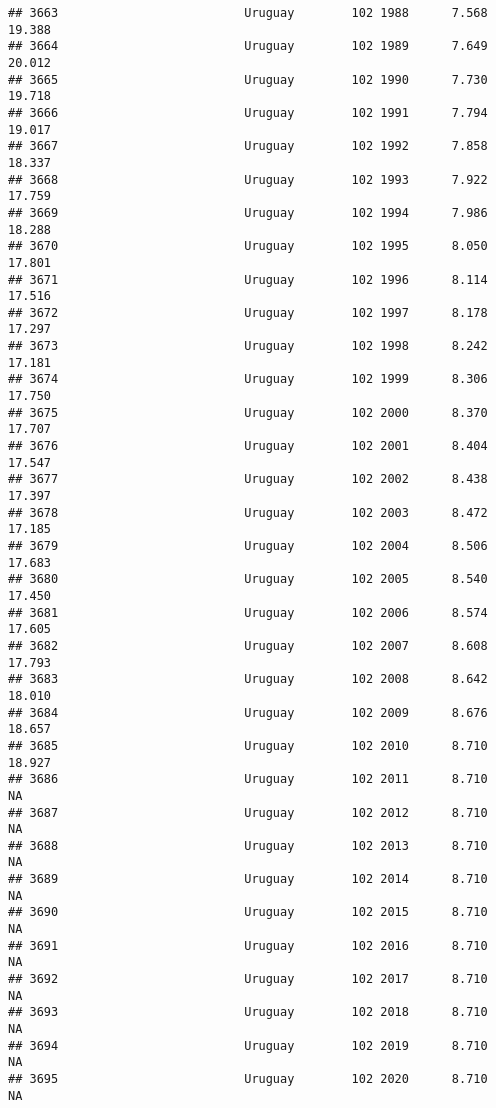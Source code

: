 \documentclass[
]{article}
\begin{document}
\begin{verbatim}
## 3663                          Uruguay        102 1988      7.568     19.388
## 3664                          Uruguay        102 1989      7.649     20.012
## 3665                          Uruguay        102 1990      7.730     19.718
## 3666                          Uruguay        102 1991      7.794     19.017
## 3667                          Uruguay        102 1992      7.858     18.337
## 3668                          Uruguay        102 1993      7.922     17.759
## 3669                          Uruguay        102 1994      7.986     18.288
## 3670                          Uruguay        102 1995      8.050     17.801
## 3671                          Uruguay        102 1996      8.114     17.516
## 3672                          Uruguay        102 1997      8.178     17.297
## 3673                          Uruguay        102 1998      8.242     17.181
## 3674                          Uruguay        102 1999      8.306     17.750
## 3675                          Uruguay        102 2000      8.370     17.707
## 3676                          Uruguay        102 2001      8.404     17.547
## 3677                          Uruguay        102 2002      8.438     17.397
## 3678                          Uruguay        102 2003      8.472     17.185
## 3679                          Uruguay        102 2004      8.506     17.683
## 3680                          Uruguay        102 2005      8.540     17.450
## 3681                          Uruguay        102 2006      8.574     17.605
## 3682                          Uruguay        102 2007      8.608     17.793
## 3683                          Uruguay        102 2008      8.642     18.010
## 3684                          Uruguay        102 2009      8.676     18.657
## 3685                          Uruguay        102 2010      8.710     18.927
## 3686                          Uruguay        102 2011      8.710         NA
## 3687                          Uruguay        102 2012      8.710         NA
## 3688                          Uruguay        102 2013      8.710         NA
## 3689                          Uruguay        102 2014      8.710         NA
## 3690                          Uruguay        102 2015      8.710         NA
## 3691                          Uruguay        102 2016      8.710         NA
## 3692                          Uruguay        102 2017      8.710         NA
## 3693                          Uruguay        102 2018      8.710         NA
## 3694                          Uruguay        102 2019      8.710         NA
## 3695                          Uruguay        102 2020      8.710         NA

\end{verbatim}
\end{document}

